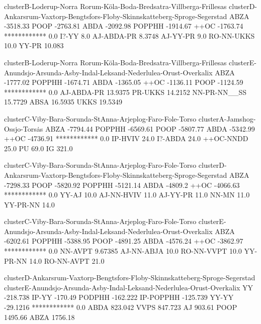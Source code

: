 clusterB-Loderup-Norra Rorum-K\"ola-Boda-Bredsatra-Villberga-Frillesas
clusterD-Ankarsrum-Vaxtorp-Bengtsfors-Floby-Skinnskatteberg-Sproge-Segerstad
ABZA -3518.33
POOP -2763.81
ABDA -2092.98
POPPHH -1914.67
++OC -1763.74
************ 0.0
I?-YY 8.0
AJ-ABDA-PR 8.3748
AJ-YY-PR 9.0
RO-NN-UKKS 10.0
YY-PR 10.083

clusterB-Loderup-Norra Rorum-K\"ola-Boda-Bredsatra-Villberga-Frillesas
clusterE-Anundsjo-Arsunda-Asby-Indal-Leksand-Nederlulea-Orust-Overkalix
ABZA -1777.02
POPPHH -1674.71
ABDA -1365.05
++OC -1136.11
POOP -1124.59
************ 0.0
AJ-ABDA-PR 13.9375
PR-UKKS 14.2152
NN-PR-NN\_\_SS 15.7729
ABSA 16.5935
UKKS 19.5349

clusterC-Viby-Bara-Sorunda-StAnna-Arjeplog-Faro-Fole-Torso
clusterA-Jamshog-Ossjo-Tors\.as
ABZA -7794.44
POPPHH -6569.61
POOP -5807.77
ABDA -5342.99
++OC -4736.91
************ 0.0
IP-HVIV 24.0
I?-ABDA 24.0
++OC-NNDD 25.0
PU 69.0
IG 321.0

clusterC-Viby-Bara-Sorunda-StAnna-Arjeplog-Faro-Fole-Torso
clusterD-Ankarsrum-Vaxtorp-Bengtsfors-Floby-Skinnskatteberg-Sproge-Segerstad
ABZA -7298.33
POOP -5820.92
POPPHH -5121.14
ABDA -4809.2
++OC -4066.63
************ 0.0
YY-AJ 10.0
AJ-NN-HVIV 11.0
AJ-YY-PR 11.0
NN-MN 11.0
YY-PR-NN 14.0

clusterC-Viby-Bara-Sorunda-StAnna-Arjeplog-Faro-Fole-Torso
clusterE-Anundsjo-Arsunda-Asby-Indal-Leksand-Nederlulea-Orust-Overkalix
ABZA -6202.61
POPPHH -5388.95
POOP -4891.25
ABDA -4576.24
++OC -3862.97
************ 0.0
NN-AVPT 9.67385
AJ-NN-ABJA 10.0
RO-NN-VVPT 10.0
YY-PR-NN 14.0
RO-NN-AVPT 21.0

clusterD-Ankarsrum-Vaxtorp-Bengtsfors-Floby-Skinnskatteberg-Sproge-Segerstad
clusterE-Anundsjo-Arsunda-Asby-Indal-Leksand-Nederlulea-Orust-Overkalix
YY -218.738
IP-YY -170.49
PODPHH -162.222
IP-POPPHH -125.739
YY-YY -29.1216
************ 0.0
ABDA 823.042
VVPS 847.723
AJ 903.61
POOP 1495.66
ABZA 1756.18

